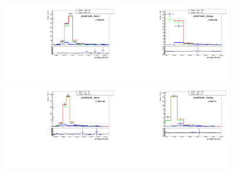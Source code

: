 \begin{figure}[htb]
  \begin{center}
   \includegraphics[width=0.45\textwidth]{../figs/figs_v11/ELECTRON_WGamma/TemplateFits/c_TEMPL_SIHIH_UNblind__phoEt75to85__Barrel__RooFit.pdf}\includegraphics[width=0.45\textwidth]{../figs/figs_v11/ELECTRON_WGamma/TemplateFits/c_TEMPL_SIHIH_UNblind__phoEt75to85__Endcap__RooFit.pdf}\\
   \includegraphics[width=0.45\textwidth]{../figs/figs_v11/ELECTRON_WGamma/TemplateFits/c_TEMPL_SIHIH_UNblind__phoEt85to95__Barrel__RooFit.pdf}\includegraphics[width=0.45\textwidth]{../figs/figs_v11/ELECTRON_WGamma/TemplateFits/c_TEMPL_SIHIH_UNblind__phoEt85to95__Endcap__RooFit.pdf}\\

\end{center}
\end{figure}
